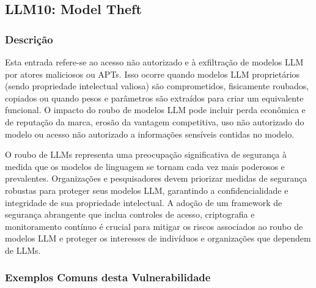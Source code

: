 \documentclass[
]{article}
\author{}
\date{}
\begin{document}
\subsection{LLM10: Model Theft}\label{llm10-model-theft}

\subsubsection{Descrição}\label{descriuxe7uxe3o}

Esta entrada refere-se ao acesso não autorizado e à exfiltração de
modelos LLM por atores maliciosos ou APTs. Isso ocorre quando modelos
LLM proprietários (sendo propriedade intelectual valiosa) são
comprometidos, fisicamente roubados, copiados ou quando pesos e
parâmetros são extraídos para criar um equivalente funcional. O impacto
do roubo de modelos LLM pode incluir perda econômica e de reputação da
marca, erosão da vantagem competitiva, uso não autorizado do modelo ou
acesso não autorizado a informações sensíveis contidas no modelo.

O roubo de LLMs representa uma preocupação significativa de segurança à
medida que os modelos de linguagem se tornam cada vez mais poderosos e
prevalentes. Organizações e pesquisadores devem priorizar medidas de
segurança robustas para proteger seus modelos LLM, garantindo a
confidencialidade e integridade de sua propriedade intelectual. A adoção
de um framework de segurança abrangente que inclua controles de acesso,
criptografia e monitoramento contínuo é crucial para mitigar os riscos
associados ao roubo de modelos LLM e proteger os interesses de
indivíduos e organizações que dependem de LLMs.

\subsubsection{Exemplos Comuns desta
Vulnerabilidade}\label{exemplos-comuns-desta-vulnerabilidade}
\end{document}
